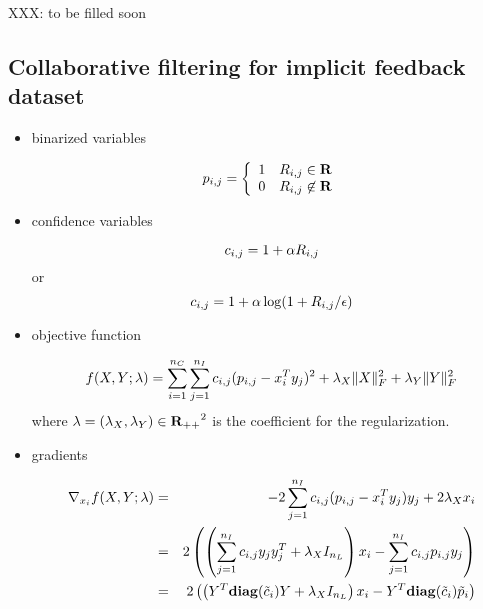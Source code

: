 XXX: to be filled soon


\fi


\subsection{Collaborative filtering for implicit feedback dataset}

\begin{itemize}

\item binarized variables

\begin{equation}
p_{i,j} = \left\{\begin{array}{ll}
1 & R_{i,j} \in \mathbf{R}
\\
0 & R_{i,j} \not\in \mathbf{R}
\end{array}\right.
\end{equation}

\item confidence variables

\begin{equation}
c_{i,j} = 1 + \alpha R_{i,j}
\end{equation}
or
\begin{equation}
c_{i,j} = 1 + \alpha \log(1 + R_{i,j}/\epsilon)
\end{equation}

\item objective function

\begin{equation}
f(X,Y; \lambda) = \sum_{i=1}^{{n_C}} \sum_{j=1}^{{n_I}} c_{i,j} (p_{i,j} - x_i^Ty_j)^2
+ \lambda_X \|X\|_F^2
+ \lambda_Y \|Y\|_F^2
\end{equation}
where $\lambda = (\lambda_X, \lambda_Y) \in {\mathbf{R}_{++}}^2$
is the coefficient for the regularization.

\item gradients

\begin{eqnarray}
\nonumber
\nabla_{x_i} f(X,Y; \lambda)
&=& -2 \sum_{j=1}^{{n_I}} c_{i,j} (p_{i,j} - x_i^Ty_j) y_j + 2 \lambda_X x_i
\\
\nonumber
&=& 2 \left( \left(
\sum_{j=1}^{{n_I}} c_{i,j} y_j y_j^T + \lambda_X I_{{n_L}}\right)x_i  - \sum_{j=1}^{{n_I}} c_{i,j} p_{i,j} y_j
\right)
\\
\label{eq:implicit-grad-x}
&=& 2 \left(\left( Y^T \mathbf{diag}(\tilde{c}_i)Y + \lambda_X I_{{n_L}} \right) x_i - Y^T \mathbf{diag}(\tilde{c}_i) \tilde{p}_i \right)
\end{eqnarray}


\end{itemize}
